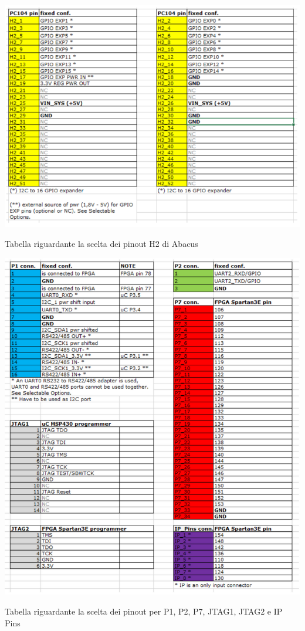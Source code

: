 \documentclass[LaM,binding=0.6cm]{../sapthesis}
\begin{document}
    \begin{table}[htbp]
    \centerline{\includegraphics[scale=.85]{examples/datasheet/abacusDatasheet8.PNG}}
    \caption{Tabella riguardante la scelta dei pinout H2 di Abacus}
    \label{fig}
    \end{table}
    
    \begin{table}[htbp]
    \centerline{\includegraphics[scale=.7]{examples/datasheet/abacusDatasheet2.PNG}}
    \caption{Tabella riguardante la scelta dei pinout per P1, P2, P7, JTAG1, JTAG2 e IP Pins}
    \label{fig}
    \end{table} 
    
\end{document}
